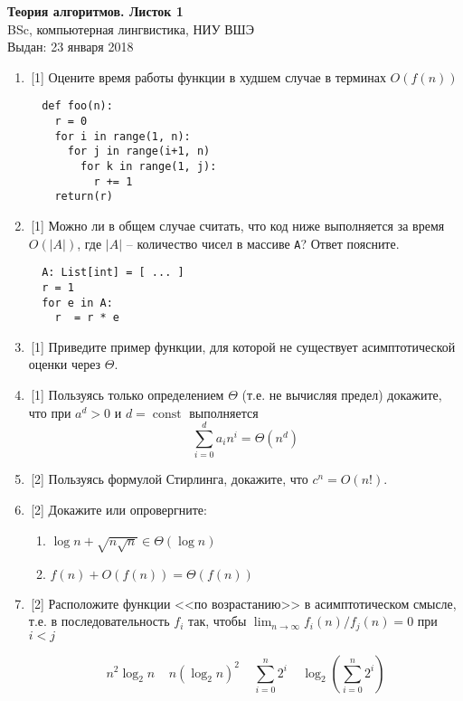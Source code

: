 \documentclass[12pt,a4paper]{report}
\def\const{\mathop{\mathrm{const}}\nolimits}
\begin{document}
\begin{center}
\textbf{\large{Теория алгоритмов. Листок 1}}\\
BSc, компьютерная лингвистика, НИУ ВШЭ\\
Выдан: 23 января 2018\\
\end{center}


\begin{enumerate}
  \item\,[1] Оцените время работы функции в худшем случае в терминах $O(f(n))$
  \begin{verbatim}
  def foo(n):
    r = 0
    for i in range(1, n):
      for j in range(i+1, n)
        for k in range(1, j):
          r += 1
    return(r)\end{verbatim}%

  \item\,[1] Можно ли в общем случае считать, что код ниже выполняется за время $O(|A|)$, где $|A|$ -- количество чисел в массиве {\tt A}? Ответ поясните.
  \begin{verbatim}
  A: List[int] = [ ... ]
  r = 1
  for e in A:
    r  = r * e\end{verbatim}%
  \item\,[1] Приведите пример функции, для которой не существует асимптотической оценки через $\Theta$.
  \item\,[1] Пользуясь только определением $\Theta$ (т.е. не вычисляя предел) докажите, что при $a^d > 0$ и $d=\const$ выполняется
  $$
  \sum_{i=0}^{d}a_i n^i = \Theta(n^d)
  $$
  \item\,[2] Пользуясь формулой Стирлинга, докажите, что $c^n = O(n!)$.
  \item\,[2] Докажите или опровергните:
    \begin{enumerate}[label=(\alph*)]
      \item $\log{n} + \sqrt{n\sqrt{n}} \in \Theta(\log{n})$
      \item $f(n) + O(f(n)) = \Theta(f(n))$
    \end{enumerate}

  \item\,[2] Расположите функции <<по возрастанию>> в асимптотическом смысле, т.е. в последовательность $f_i$ так, чтобы $\lim_{n\to\infty} f_i(n)/f_j(n) = 0$ при $i < j$

  $$
n^2\log_2n ~~~~~ n(\log_2n)^2 ~~~~~ \sum_{i=0}^n 2^i ~~~~~ \log_2\left(\sum_{i=0}^n 2^i\right)
  $$



\end{enumerate}
\end{document}
